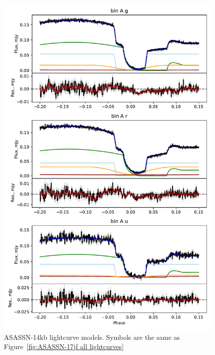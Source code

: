 \begin{figure}
    \centering
    \includegraphics[width=\textwidth]{figures/results/ASASSN-14kb/ASASSN-14kb_1.pdf}
    \caption{ASASSN-14kb lightcurve models. Symbols are the same as Figure~\ref{fig:ASASSN-17jf all lightcurves}}
    \label{fig:ASASSN-14kb all lightcurves}
\end{figure}
